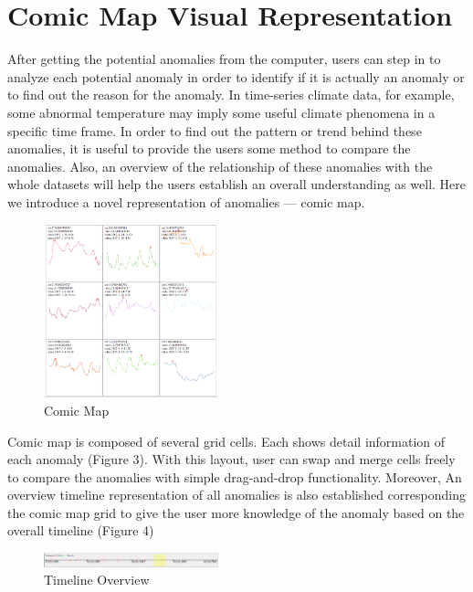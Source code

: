 \documentclass{vgtc}                          %
\begin{document}
\section{Comic Map Visual Representation}

After getting the potential anomalies from the computer, users can step in to analyze each potential anomaly in order to identify if it is actually an anomaly or to find out the reason for the anomaly. In time-series climate data, for example, some abnormal temperature may imply some useful climate phenomena in a specific time frame. In order to find out the pattern or trend behind these anomalies, it is useful to provide the users some method to compare the anomalies. Also, an overview of the relationship of these anomalies with the whole datasets will help the users establish an overall understanding as well. Here we introduce a novel representation of anomalies --– comic map. 

\begin{figure}[htb]
	\centering
	\includegraphics[width=0.45\textwidth]{comicMap9Cell.jpg}
	\caption{Comic Map}
\end{figure}

Comic map is composed of several grid cells. Each shows detail information of each anomaly (Figure 3). With this layout, user can swap and merge cells freely to compare the anomalies with simple drag-and-drop functionality. Moreover, An overview timeline representation of all anomalies is also established corresponding the comic map grid to give the user more knowledge of the anomaly based on the overall timeline (Figure 4)

\begin{figure}[htb]
	\centering
	\includegraphics[width=0.45\textwidth]{timeline.png}
	\caption{Timeline Overview}
\end{figure}
\end{document}
